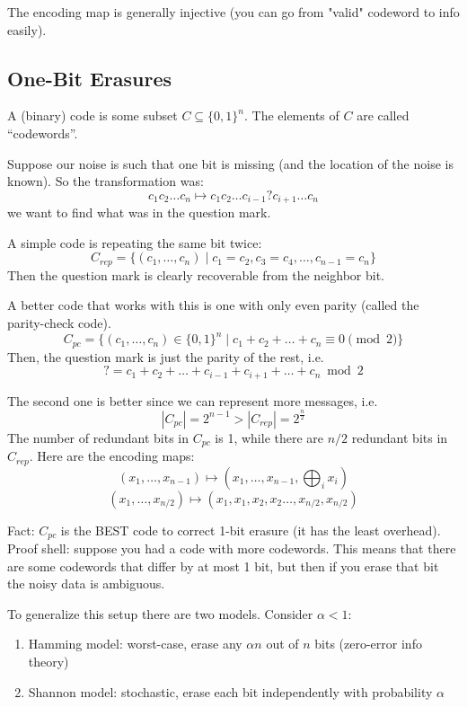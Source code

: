 The encoding map is generally injective (you can go from "valid" codeword to info easily).

\subsection{One-Bit Erasures}

\begin{definition}
    A (binary) code is some subset $C \subseteq \{0, 1\}^n$. The elements of $C$ are called ``codewords''.
\end{definition}

Suppose our noise is such that one bit is missing (and the location of the noise is known). So the transformation was:
\[ c_1 c_2 \dots c_n \mapsto c_1 c_2 \dots c_{i - 1} ? c_{i + 1} \dots c_n \]
we want to find what was in the question mark. 

A simple code is repeating the same bit twice:
\[ C_{rep} = \{(c_1, \dots, c_n) \mid c_1 = c_2, c_3 = c_4, \dots, c_{n - 1} = c_n \} \]
Then the question mark is clearly recoverable from the neighbor bit.

A better code that works with this is one with only even parity (called the parity-check code).
\[ C_{pc} = \{(c_1, \dots, c_n) \in \{0, 1\}^n \mid c_1 + c_2 + \dots + c_n \equiv 0 \pmod 2 \} \]
Then, the question mark is just the parity of the rest, i.e.
\[ ? = c_1 + c_2 + \dots + c_{i - 1} + c_{i + 1} + \dots + c_n \bmod 2 \]

The second one is better since we can represent more messages, i.e.
\[ |C_{pc}| = 2^{n - 1} > |C_{rep}| = 2^{\frac{n}{2}} \]
The number of redundant bits in $C_{pc}$ is 1, while there are $n/2$ redundant bits in $C_{rep}$.
Here are the encoding maps:
\[ (x_1, \dots, x_{n - 1}) \mapsto (x_1, \dots, x_{n - 1}, \bigoplus_{i} x_i) \]
\[ (x_1, \dots, x_{n/2}) \mapsto (x_1, x_1, x_2, x_2 \dots, x_{n/2}, x_{n/2}) \]

Fact: $C_{pc}$ is the BEST code to correct 1-bit erasure (it has the least overhead). Proof shell:
suppose you had a code with more codewords. This means that there are some codewords that differ by at most 1 bit, but then
if you erase that bit the noisy data is ambiguous. 

To generalize this setup there are two models. Consider $\alpha < 1$:

\begin{enumerate}
    \item Hamming model: worst-case, erase any $\alpha n$ out of $n$ bits (zero-error info theory)
    \item Shannon model: stochastic, erase each bit independently with probability $\alpha$
\end{enumerate}

